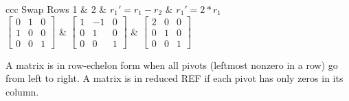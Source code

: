 \documentclass[10pt]{extarticle}
\begin{document}
\begin{multicols*}{2}
	\begin{tabular}{ccc}
		Swap Rows 1 \& 2 & $r_1' = r_1 - r_2$ & $r_1' = 2*r_1$ \\
		\( \begin{bmatrix}
			0 & 1 & 0 \\
			1 & 0 & 0 \\
			0 & 0 & 1
		\end{bmatrix} \) &
		\( \begin{bmatrix}
			1 & -1 & 0 \\
			0 & 1 & 0 \\
			0 & 0 & 1
		\end{bmatrix} \) &
		\( \begin{bmatrix}
			2 & 0 & 0 \\
			0 & 1 & 0 \\
			0 & 0 & 1
		\end{bmatrix} \)
	\end{tabular}

A matrix is in row-echelon form when all pivots (leftmost nonzero in a row) go from left to right. A matrix is in reduced REF if each pivot has only zeros in its column.


\end{multicols*}
\end{document}
